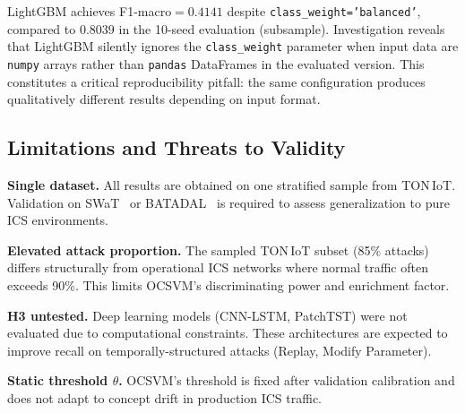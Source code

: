LightGBM achieves F1-macro$=0.4141$ despite \texttt{class\_weight='balanced'},
compared to $0.8039$ in the 10-seed evaluation (subsample). Investigation
reveals that LightGBM silently ignores the \texttt{class\_weight} parameter
when input data are \texttt{numpy} arrays rather than \texttt{pandas}
DataFrames in the evaluated version. This constitutes a critical reproducibility
pitfall: the same configuration produces qualitatively different results
depending on input format.

\subsection{Limitations and Threats to Validity}
\label{sec:discussion_limits}

\textbf{Single dataset.} All results are obtained on one stratified sample
from TON\,IoT. Validation on SWaT~\cite{ref_SWaT} or BATADAL~\cite{ref_BATADAL}
is required to assess generalization to pure ICS environments.

\textbf{Elevated attack proportion.} The sampled TON\,IoT subset (85\% attacks)
differs structurally from operational ICS networks where normal traffic often
exceeds 90\%. This limits OCSVM's discriminating power and enrichment factor.

\textbf{H3 untested.} Deep learning models (CNN-LSTM, PatchTST) were not
evaluated due to computational constraints. These architectures are expected
to improve recall on temporally-structured attacks (Replay, Modify Parameter).

\textbf{Static threshold $\theta$.} OCSVM's threshold is fixed after validation
calibration and does not adapt to concept drift in production ICS traffic.
